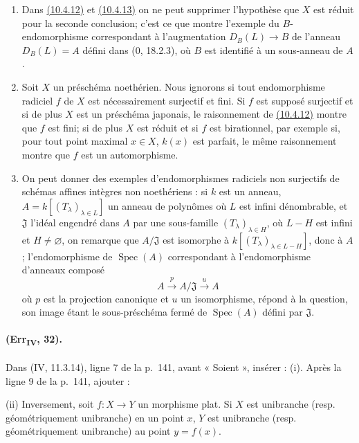 \begin{remark}[10.4.14]
\label{IV.10.4.14}
\begin{enumerate}[label=\textup{(\roman*)}]
\item Dans {\hyperlink{ega4.c04.cor.10-4-12}{(10.4.12)}} et
{\hyperlink{ega4.c04.cor.10-4-13}{(10.4.13)}} on ne peut supprimer
l'hypothèse que $X$ est réduit pour la seconde conclusion; c'est ce que
montre l'exemple du $B$-endomorphisme correspondant à l'augmentation
$D_B(L)\to B$ de l'anneau $D_B(L)=A$ défini dans ($0$, 18.2.3), où
$B$ est identifié à un sous-anneau de $A$.

\item Soit $X$ un préschéma noethérien. Nous ignorons si tout
endomorphisme radiciel $f$ de $X$ est nécessairement surjectif et fini.
Si $f$ est supposé surjectif et si de plus $X$ est un préschéma
japonais, le raisonnement de
{\hyperlink{ega4.c04.cor.10-4-12}{(10.4.12)}} montre que $f$ est fini;
si de plus $X$ est réduit et si $f$ est birationnel, par exemple si,
pour tout point maximal $x\in X$, $k(x)$ est parfait, le même
raisonnement montre que $f$ est un automorphisme.

\item On peut donner des exemples d'endomorphismes radiciels non
surjectifs de schémas affines intègres non noethériens : si $k$ est un
anneau, $A=k[(T_\lambda)_{\lambda\in L}]$ un anneau de polynômes où $L$
est infini dénombrable, et $\mathfrak J$ l'idéal engendré dans $A$ par
une sous-famille $(T_\lambda)_{\lambda\in H}$, où $L-H$ est infini et
$H\neq\varnothing$, on remarque que $A/\mathfrak J$ est isomorphe à
$k[(T_\lambda)_{\lambda\in L-H}]$, donc à $A$; l'endomorphisme de
$\operatorname{Spec}(A)$ correspondant à l'endomorphisme d'anneaux
composé
\[
 A\xrightarrow{p}A/\mathfrak J\xrightarrow{u}A
\]
où $p$ est la projection canonique et $u$ un isomorphisme, répond à la
question, son image étant le sous-préschéma fermé de
$\operatorname{Spec}(A)$ défini par $\mathfrak J$.
\end{enumerate}
\end{remark}

\paragraph{(Err\textsubscript{IV}, 32).}
Dans (IV, 11.3.14), ligne 7 de la p.~141, avant « Soient », insérer :
(i). Après la ligne 9 de la p.~141, ajouter :

\smallskip
\noindent
\textup{(ii)} Inversement, soit $f:X\to Y$ un morphisme plat. Si $X$
est unibranche (resp. géométriquement unibranche) en un point $x$, $Y$
est unibranche (resp. géométriquement unibranche) au point $y=f(x)$.

